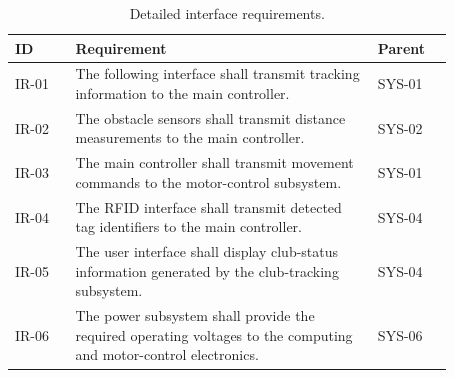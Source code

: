 
\begin{table}[H]
\centering
\caption{Detailed interface requirements.}
\label{tab:app-interface}
\footnotesize
\begin{tabular}{p{0.12\linewidth} p{0.60\linewidth} p{0.15\linewidth}}
\hline
\textbf{ID} & \textbf{Requirement} & \textbf{Parent} \\
\hline
IR-01 & The following interface shall transmit tracking information to the main controller. & SYS-01 \\
IR-02 & The obstacle sensors shall transmit distance measurements to the main controller. & SYS-02 \\
IR-03 & The main controller shall transmit movement commands to the motor-control subsystem. & SYS-01 \\
IR-04 & The RFID interface shall transmit detected tag identifiers to the main controller. & SYS-04 \\
IR-05 & The user interface shall display club-status information generated by the club-tracking subsystem. & SYS-04 \\
IR-06 & The power subsystem shall provide the required operating voltages to the computing and motor-control electronics. & SYS-06 \\
\hline
\end{tabular}
\end{table}


